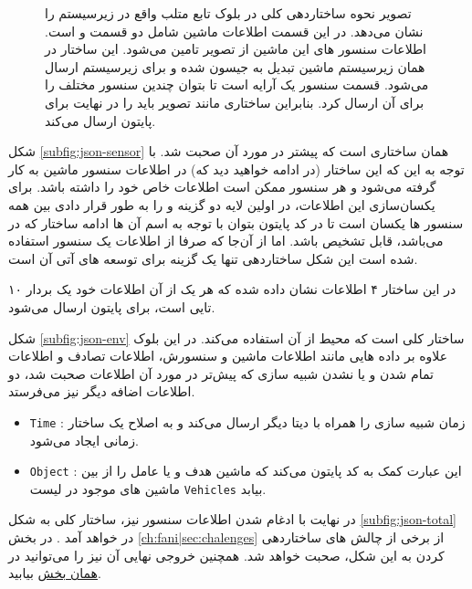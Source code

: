 \begin{figure}[h!]
{		\label{subfig:json-total}
	}
	\caption[ساختار جیسون برای بلوک های سیمولینک]{%
		تصویر
		نحوه ساختار‌دهی کلی در بلوک تابع متلب واقع در زیرسیستم 
		را نشان می‌دهد. در این قسمت اطلاعات ماشین شامل دو قسمت  و  است. اطلاعات سنسور های این ماشین  از تصویر  تامین می‌شود. این ساختار در همان زیرسیستم ماشین تبدیل به جیسون شده و برای زیر‌سیستم  ارسال می‌شود. قسمت سنسور یک آرایه است تا بتوان چندین سنسور مختلف را برای آن ارسال کرد. بنابراین ساختاری مانند تصویر  باید را در نهایت برای پایتون ارسال می‌کند.
		\footnotemark
	}
	\label{fig:json-total}
\end{figure}
شکل \ref{subfig:json-sensor} همان ساختاری است که پیشتر در مورد آن صحبت شد. با توجه به این که این ساختار (در ادامه خواهید دید که) در اطلاعات سنسور ماشین به کار گرفته می‌شود و هر سنسور ممکن است اطلاعات خاص خود را داشته باشد. برای یکسان‌سازی این اطلاعات، در اولین لایه دو گزینه  و  را به طور قرار دادی بین همه سنسور ها یکسان است تا در کد پایتون بتوان با توجه به اسم آن ها ادامه ساختار که در  می‌باشد، قابل تشخیص باشد. اما از آن‌جا که صرفا از اطلاعات یک سنسور استفاده شده است این شکل ساختار‌دهی تنها یک گزینه برای توسعه های آتی آن است.

در این ساختار ۴ اطلاعات نشان داده شده که هر یک از آن اطلاعات خود یک بردار ۱۰ تایی است، برای پایتون ارسال می‌شود. 

شکل 
\ref{subfig:json-env}
ساختار کلی است که محیط  از آن استفاده می‌کند. در این بلوک علاوه بر داده هایی مانند اطلاعات ماشین و سنسورش، اطلاعات تصادف و اطلاعات تمام شدن و یا نشدن شبیه سازی که پیش‌‌تر در مورد آن اطلاعات صحبت شد، دو اطلاعات اضافه دیگر نیز می‌فرستد.
\begin{itemize}
	\item \texttt{Time} :
	زمان شبیه سازی را همراه با دیتا دیگر ارسال می‌کند و به اصلاح یک ساختار زمانی ایجاد می‌شود.
	\item \texttt{Object} :
	این عبارت کمک به کد پایتون می‌کند که ماشین هدف و یا عامل را از بین ماشین های موجود در لیست \texttt{Vehicles} بیابد. 
\end{itemize}

در نهایت با ادغام شدن اطلاعات سنسور نیز، ساختار کلی به شکل \ref{subfig:json-total} در خواهد آمد . در بخش
\ref{ch:fani|sec:chalenges}
از برخی از چالش های ساختاردهی کردن به این شکل، صحبت خواهد شد. همچنین خروجی نهایی آن نیز را می‌توانید در 
\hyperref[code:json]{همان بخش}
بیابید.

